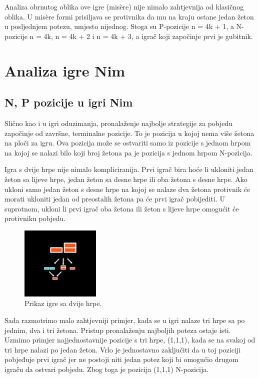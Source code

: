 Analiza obrnutog oblika ove igre (misère) nije nimalo zahtjevnija od klasičnog oblika. U misère formi prisiljava se protivnika da mu na kraju ostane jedan žeton u posljednjem potezu, umjesto nijednog. Stoga su P-pozicije n = 4k + 1, a N-pozicije n = 4k, n = 4k + 2 i n = 4k + 3, a igrač koji započinje prvi je gubitnik.



\section{Analiza igre Nim}

\subsection*{N, P pozicije u igri Nim}

Slično kao i u igri oduzimanja, pronalaženje najbolje strategije za pobjedu započinje od završne, terminalne pozicije. To je pozicija u kojoj nema više žetona na ploči za igru. Ova pozicija može se ostvariti samo iz pozicije s jednom hrpom na kojoj se nalazi bilo koji broj žetona pa je pozicija s jednom hrpom N-pozicija. 

Igra s dvije hrpe nije nimalo kompliciranija. Prvi igrač bira hoće li ukloniti jedan žeton sa lijeve hrpe, jedan žeton sa desne hrpe ili oba žetona s desne hrpe. Ako ukloni samo jedan žeton s desne hrpe na kojoj se nalaze dva žetona protivnik će morati ukloniti jedan od preostalih žetona pa će prvi igrač pobijediti. U suprotnom, ukloni li prvi igrač oba žetona ili žeton s lijeve hrpe omogućit će protivniku pobjedu.

\begin{figure}[H]
\centering
\includegraphics[]{slike-analiza/slika1.png}
\caption{Prikaz igre sa dvije hrpe.}
\label{}
\end{figure}


Sada razmotrimo malo zahtjevniji primjer, kada se u igri nalaze tri hrpe sa po jednim, dva i tri žetona. Pristup pronalaženju najboljih poteza ostaje isti. Uzmimo primjer najjednostavnije pozicije s tri hrpe, (1,1,1), kada se na svakoj od tri hrpe nalazi po jedan žeton. Vrlo je jednostavno zaključiti da u toj poziciji pobjeđuje prvi igrač jer ne postoji niti jedan potez koji bi omogućio drugom igraču da ostvari pobjedu. Zbog toga je pozicija (1,1,1) N-pozicija.

